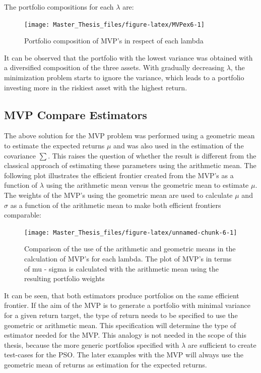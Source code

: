 \documentclass[
  oneside, a4paper, 12pt, openany]{book}
\theoremstyle{definition}
\theoremstyle{definition}
\theoremstyle{definition}
\theoremstyle{definition}
\theoremstyle{remark}
\begin{document}
The portfolio compositions for each \(\lambda\) are:

\begin{figure}[H]
\texttt{[image: Master\_Thesis\_files/figure-latex/MVPex6-1]} \caption{Portfolio composition of MVP's in respect of each lambda}\label{fig:MVPex6}
\end{figure}

It can be observed that the portfolio with the lowest variance was obtained with a diversified composition of the three assets. With gradually decreasing \(\lambda\), the minimization problem starts to ignore the variance, which leads to a portfolio investing more in the riskiest asset with the highest return.

\hypertarget{mvp-compare-estimators}{%
\subsection{MVP Compare Estimators}\label{mvp-compare-estimators}}

The above solution for the MVP problem was performed using a geometric mean to estimate the expected returns \(\mu\) and was also used in the estimation of the covariance \(\textstyle\sum\). This raises the question of whether the result is different from the classical approach of estimating these parameters using the arithmetic mean. The following plot illustrates the efficient frontier created from the MVP's as a function of \(\lambda\) using the arithmetic mean versus the geometric mean to estimate \(\mu\). The weights of the MVP's using the geometric mean are used to calculate \(\mu\) and \(\sigma\) as a function of the arithmetic mean to make both efficient frontiers comparable:

\begin{figure}[H]
\texttt{[image: Master\_Thesis\_files/figure-latex/unnamed-chunk-6-1]} \caption{Comparison of the use of the arithmetic and geometric means in the calculation of MVP's for each lambda. The plot of MVP's in terms of mu - sigma is calculated with the arithmetic mean using the resulting portfolio weights}\label{fig:unnamed-chunk-6}
\end{figure}

It can be seen, that both estimators produce portfolios on the same efficient frontier. If the aim of the MVP is to generate a portfolio with minimal variance for a given return target, the type of return needs to be specified to use the geometric or arithmetic mean. This specification will determine the type of estimator needed for the MVP. This analogy is not needed in the scope of this thesis, because the more generic portfolios specified with \(\lambda\) are sufficient to create test-cases for the PSO. The later examples with the MVP will always use the geometric mean of returns as estimation for the expected returns.
\end{document}
